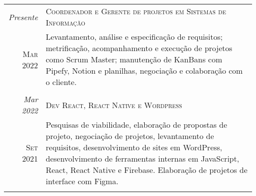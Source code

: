 \documentclass[a4paper]{article}
\begin{document}
\begin{multicols}{2}
\begin{framed}
    \begin{tabular}{r|p{5cm}}
      \emph{Presente}   & \textsc{Coordenador e Gerente de projetos em Sistemas de Informação}                                                                                                                                                                                                                                          \\
      \textsc{Mar 2022} & \footnotesize{Levantamento, análise e especificação de requisitos; metrificação, acompanhamento e execução de projetos como Scrum Master; manutenção de KanBans com Pipefy, Notion e planilhas, negociação e colaboração com o cliente.}                                                                      \\
      \multicolumn{2}{c}{}                                                                                                                                                                                                                                                                                                              \\

      \emph{Mar 2022}   & \textsc{Dev React, React Native e Wordpress }                                                                                                                                                                                                                                                                 \\
      \textsc{Set 2021} & \footnotesize{Pesquisas de viabilidade, elaboração de propostas de projeto, negociação de projetos, levantamento de requisitos, desenvolvimento de sites em WordPress, desenvolvimento de ferramentas internas em JavaScript, React, React Native e Firebase. Elaboração de projetos de interface com Figma.} \\
      \multicolumn{2}{c}{}                                                                                                                                                                                                                                                                                                              \\


\end{tabular}
\end{framed}
\end{multicols}
\end{document}
